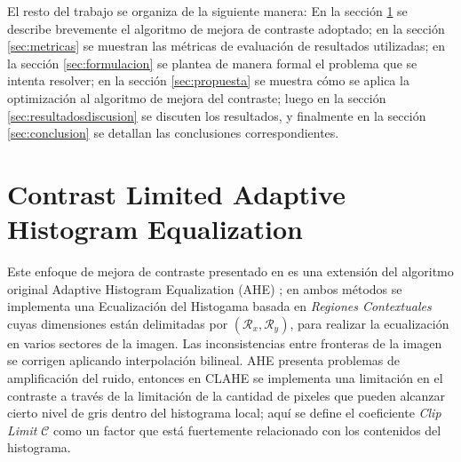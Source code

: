 \documentclass[spanish,twocolumn]{article}
\begin{document}
El resto del trabajo se organiza de la siguiente manera: En la sección \ref{sec:clahe} se describe brevemente el algoritmo de mejora de contraste adoptado; en la sección \ref{sec:metricas} se muestran las métricas de evaluación de resultados utilizadas; en la sección \ref{sec:formulacion} se plantea de manera formal el problema que se intenta resolver; en la sección \ref{sec:propuesta} se muestra cómo se aplica la optimización al algoritmo de mejora del contraste; luego en la sección \ref{sec:resultadosdiscusion} se discuten los resultados, y finalmente en la sección \ref{sec:conclusion} se detallan las conclusiones correspondientes. 




\section{Contrast Limited Adaptive Histogram Equalization}
\label{sec:clahe}
Este enfoque de mejora de contraste presentado en \cite{Zuiderveld:1994:CLA:180895.180940} es una extensión del algoritmo original Adaptive Histogram Equalization (AHE) \cite{pizer1987adaptive}; en ambos métodos se implementa una Ecualización del Histogama basada en {\it Regiones Contextuales} cuyas dimensiones están delimitadas por $(\mathcal{R}_x, \mathcal{R}_y)$, para realizar la ecualización en varios sectores de la imagen. Las inconsistencias entre fronteras de la imagen se corrigen aplicando interpolación bilineal. AHE presenta problemas de amplificación del ruido, entonces en CLAHE se implementa una limitación en el contraste a través de la limitación de la cantidad de pixeles que pueden alcanzar cierto nivel de gris dentro del histograma local; aquí se define el coeficiente {\it Clip Limit} $\mathcal{C}$ como un factor que está fuertemente relacionado con los contenidos del histograma. %
\end{document}
